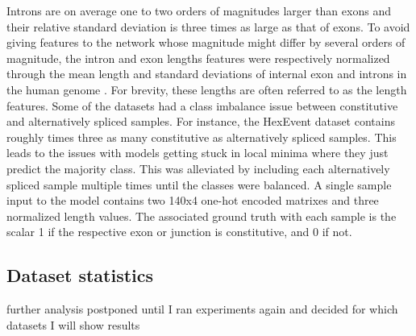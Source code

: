 Introns are on average one to two orders of magnitudes larger than exons and their relative standard deviation is three times as large as that of exons. To avoid giving features to the network whose magnitude might differ by several orders of magnitude, the intron and exon lengths features were respectively normalized through the mean length and standard deviations of internal exon and introns in the human genome \cite{exonintronlens}. For brevity, these lengths are often referred to as the length features.
Some of the datasets had a class imbalance issue between constitutive and alternatively spliced samples. For instance, the HexEvent dataset contains roughly times three as many constitutive as alternatively spliced samples. This leads to the issues with models getting stuck in local minima where they just predict the majority class. This was alleviated by including each alternatively spliced sample multiple times until the classes were balanced.
A single sample input to the model contains two 140x4 one-hot encoded matrixes and three normalized length values. The associated ground truth with each sample is the scalar 1 if the respective exon or junction is constitutive, and 0 if not.
\subsection{Dataset statistics} \cite{subsec:datasetstatistics}

further analysis postponed until I ran experiments again and decided for which datasets I will show results 

